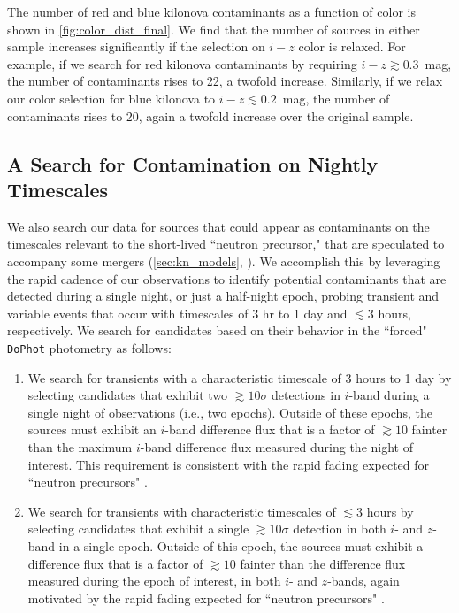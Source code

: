 The number of red and blue kilonova contaminants as a function of color is shown in \autoref{fig:color_dist_final}. We find that the number of sources in either sample increases significantly if the selection on $i-z$ color is relaxed. For example, if we search for red kilonova contaminants by requiring $i-z \gtrsim 0.3$~mag, the number of contaminants rises to 22, a twofold increase. Similarly, if we relax our color selection for blue kilonova to $i-z \lesssim 0.2$~mag, the number of contaminants rises to 20, again a twofold increase over the original sample. 

\subsection{A Search for Contamination on Nightly Timescales}
\label{sec:kn_short}
We also search our data for sources that could appear as contaminants on the timescales relevant to the short-lived ``neutron precursor," that are speculated to accompany some mergers (\autoref{sec:kn_models}, \citealt{metzger15}). We accomplish this by leveraging the rapid cadence of our observations to identify potential contaminants that are detected during a single night, or just a half-night epoch, probing transient and variable events that occur with timescales of $3$ hr to 1 day and $\lesssim3$ hours, respectively. We search for candidates based on their behavior in the ``forced" {\tt DoPhot} photometry as follows:

\begin{enumerate}
\item We search for transients with a characteristic timescale of 3 hours to 1 day by selecting candidates that exhibit two $\gtrsim 10\sigma$ detections in $i$-band during a single night of observations (i.e., two epochs). Outside of these epochs, the sources must exhibit an $i$-band difference flux that is a factor of $\gtrsim 10$ fainter than the maximum $i$-band difference flux measured during the night of interest. This requirement is consistent with the rapid fading expected for ``neutron precursors" \citep{metzger15}.

\item We search for transients with characteristic timescales of $\lesssim 3$ hours by selecting candidates that exhibit a single $\gtrsim 10\sigma$ detection in both $i$- and $z$-band in a single epoch. Outside of this epoch, the sources must exhibit a difference flux that is a factor of $\gtrsim 10$ fainter than the difference flux measured during the epoch of interest, in both $i$- and $z$-bands, again motivated by the rapid fading expected for ``neutron precursors" \citep{metzger15}.
\end{enumerate}


